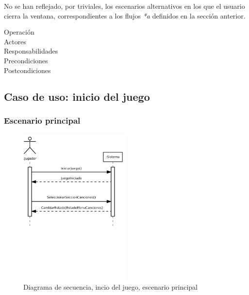 \begin{nota}
  No se han reflejado, por triviales, los escenarios alternativos en los que el
  usuario cierra la ventana, correspondientes a los flujos \textit{*a} definidos
  en la sección anterior.
\end{nota}

\begin{description}
\item[Operación] 
\item[Actores]
\item[Responsabilidades]
\item[Precondiciones]
\item[Postcondiciones]
\end{description}

\subsection{Caso de uso: inicio del juego}

\subsubsection{Escenario principal}

\begin{figure}[h!]
  \centering
  \includegraphics[trim=0cm 10cm 0cm 0cm, clip=true, width=0.5\textwidth]{4_analisis/diagsec_caso1_esc1}
  \caption{Diagrama de secuencia, incio del juego, escenario principal}
\end{figure}

